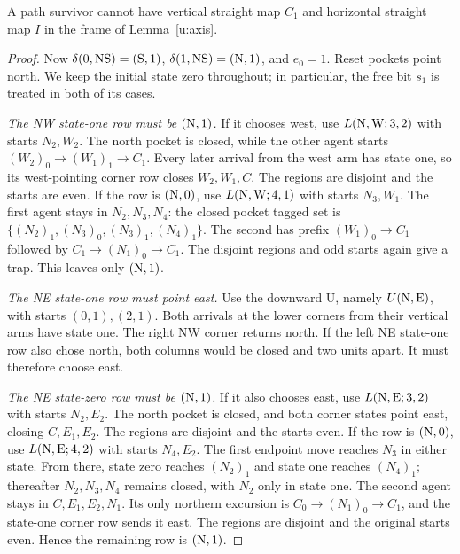 \begin{lemma}\label{u:mixed1}
A path survivor cannot have vertical straight map $C_1$ and
horizontal straight map $I$ in the frame of Lemma~\ref{u:axis}.
\end{lemma}

\begin{proof}
Now
$\delta(0,\mathrm{NS})=(\mathrm{S},1)$,
$\delta(1,\mathrm{NS})=(\mathrm{N},1)$, and $e_0=1$.
Reset pockets point north. We keep the initial state zero throughout;
in particular, the free bit $s_1$ is treated in both of its cases.

\emph{The NW state-one row must be $(\mathrm{N},1)$.}
If it chooses west, use $L(\mathrm{N},\mathrm{W};3,2)$ with starts $N_2,W_2$.
The north pocket is closed, while the other agent starts
$(W_2)_0\to(W_1)_1\to C_1$. Every later arrival from the west
arm has state one, so its west-pointing corner row closes
$W_2,W_1,C$. The regions are disjoint and the starts are even.
If the row is $(\mathrm{N},0)$, use $L(\mathrm{N},\mathrm{W};4,1)$ with starts $N_3,W_1$.
The first agent stays in $N_2,N_3,N_4$: the closed pocket tagged
set is $\{(N_2)_1,(N_3)_0,(N_3)_1,(N_4)_1\}$.
The second has prefix $(W_1)_0\to C_1$ followed by
$C_1\to(N_1)_0\to C_1$.
The disjoint regions and odd starts again give a trap.
This leaves only $(\mathrm{N},1)$.

\emph{The NE state-one row must point east.}
Use the downward U, namely $U(\mathrm{N},\mathrm{E})$, with starts
$(0,1),(2,1)$. Both arrivals at the lower corners from their
vertical arms have state one. The right NW corner returns north.
If the left NE state-one row also chose north, both columns would
be closed and two units apart. It must therefore choose east.

\emph{The NE state-zero row must be $(\mathrm{N},1)$.}
If it also chooses east, use $L(\mathrm{N},\mathrm{E};3,2)$ with starts $N_2,E_2$.
The north pocket is closed, and both corner states point east,
closing $C,E_1,E_2$. The regions are disjoint and the starts even.
If the row is $(\mathrm{N},0)$, use $L(\mathrm{N},\mathrm{E};4,2)$ with starts $N_4,E_2$.
The first endpoint move reaches $N_3$ in either state. From there,
state zero reaches $(N_2)_1$ and state one reaches $(N_4)_1$;
thereafter $N_2,N_3,N_4$ remains closed, with $N_2$ only in state
one. The second agent stays in $C,E_1,E_2,N_1$. Its only northern
excursion is $C_0\to(N_1)_0\to C_1$, and the state-one corner
row sends it east. The regions are disjoint and the original
starts even. Hence the remaining row is $(\mathrm{N},1)$.


\end{proof}
